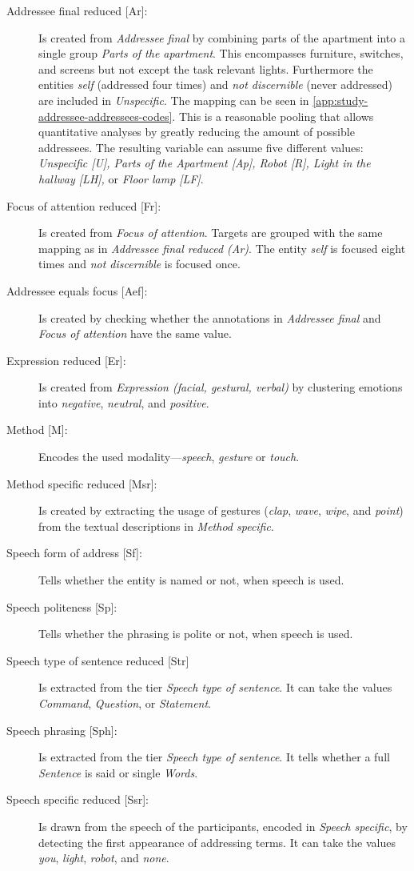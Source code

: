 \begin{description}
    \item[{Addressee final reduced [Ar]:}] Is created from \emph{Addressee final} by combining parts of the \gls{apartment} into a single group \emph{Parts of the apartment}.
    This encompasses furniture, switches, and screens but not except the task relevant lights.
    Furthermore the entities \emph{self} (addressed four times) and \emph{not discernible} (never addressed) are included in \emph{Unspecific}.
    The mapping can be seen in \cref{app:study-addressee-addressees-codes}.
    This is a reasonable pooling that allows quantitative analyses by greatly reducing the amount of possible \glspl{addressee}.
    The resulting variable can assume five different values: \emph{Unspecific [U], Parts of the Apartment [Ap], Robot [R], Light in the hallway [LH], } or \emph{Floor lamp [LF]}.
    \item[{Focus of attention reduced [Fr]:}] Is created from \emph{Focus of attention}.
    Targets are grouped with the same mapping as in \emph{Addressee final reduced (Ar)}. 
    The entity \emph{self} is focused eight times and \emph{not discernible} is focused once.
    \item[{Addressee equals focus [Aef]:}] Is created by checking whether the annotations in \emph{Addressee final} and \emph{Focus of attention} have the same value.
    \item[{Expression reduced [Er]:}] Is created from \emph{Expression (facial, gestural, verbal)} by clustering emotions into \emph{negative}, \emph{neutral}, and \emph{positive}.
    \item[{Method [M]:}] Encodes the used modality---\emph{speech}, \emph{gesture} or \emph{touch}.
    \item[{Method specific reduced [Msr]:}] Is created by extracting the usage of gestures (\emph{clap}, \emph{wave}, \emph{wipe}, and \emph{point}) from the textual descriptions in \emph{Method specific}.
    \item[{Speech form of address [Sf]:}] Tells whether the entity is named or not, when speech is used.
    \item[{Speech politeness [Sp]:}] Tells whether the phrasing is polite or not, when speech is used.
    \item[{Speech type of sentence reduced [Str]}] Is extracted from the tier \emph{Speech type of sentence}.
    It can take the values \emph{Command}, \emph{Question}, or \emph{Statement}. 
    \item[{Speech phrasing [Sph]:}] Is extracted from the tier \emph{Speech type of sentence}.
    It tells whether a full \emph{Sentence} is said or single \emph{Words}.
    \item[{Speech specific reduced [Ssr]:}] Is drawn from the speech of the participants, encoded in \emph{Speech specific}, by detecting the first appearance of addressing terms.
    It can take the values \emph{you}, \emph{light}, \emph{robot}, and \emph{none}.
\end{description}
